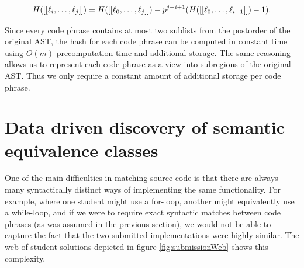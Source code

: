 {\scriptsize
\[
H([[{\bf \ell}_{i},\dots,{\bf \ell}_{j}]]) =  H([[{\bf \ell}_{0},\dots,{\bf \ell}_{j}]]) - p^{j-i+1} (H([[{\bf \ell}_{0},\dots,{\bf \ell}_{i-1}]]) - 1).
\]
}

\noindent Since every code phrase contains at most two sublists from the postorder of the
original AST, the hash for each code phrase can be computed in constant time using $O(m)$ precomputation time and additional storage.
The same reasoning allows us to represent each
code phrase as a view into subregions of the original AST.  
Thus we only require a constant amount of additional storage per code phrase.




\section{Data driven discovery of semantic equivalence classes}\label{sec:equivalence}
One of the main difficulties in matching source code  is that there are  
always many syntactically distinct ways of implementing the same functionality. 
For example, where one student might use a for-loop, another might equivalently use a while-loop,
and if we were to require exact syntactic matches between code phrases (as was assumed in the previous section), we would not be
able to capture the fact that the two submitted implementations were highly similar. The web of student solutions depicted in figure \ref{fig:submissionWeb} shows this complexity.

